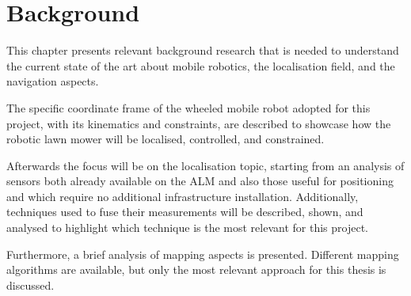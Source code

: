 \chapter{Background}
\label{ch:background}





\noindent This chapter presents relevant background research that is needed to understand the current state of the art about mobile robotics, the localisation field, and the navigation aspects.

The specific coordinate frame of the wheeled mobile robot adopted for this project, with its kinematics and constraints, are described to showcase how the robotic lawn mower will be localised, controlled, and constrained.

Afterwards the focus will be on the localisation topic, starting from an analysis of sensors both already available on the \gls{ALM} and also those useful for positioning and which require no additional infrastructure installation.
Additionally, techniques used to fuse their measurements will be described, shown, and analysed to highlight which technique is the most relevant for this project.

Furthermore, a brief analysis of mapping aspects is presented.
Different mapping algorithms are available, but only the most relevant approach for this thesis is discussed.

